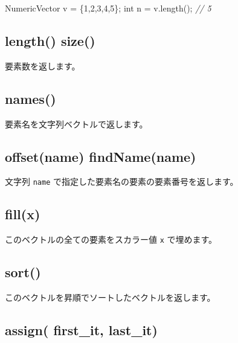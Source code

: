 \documentclass[]{book}
\newenvironment{Shaded}{\begin{snugshade}}{\end{snugshade}}
\newcommand{\CommentTok}[1]{\textcolor[rgb]{0.56,0.35,0.01}{\textit{#1}}}
\newcommand{\DataTypeTok}[1]{\textcolor[rgb]{0.13,0.29,0.53}{#1}}
\newcommand{\DecValTok}[1]{\textcolor[rgb]{0.00,0.00,0.81}{#1}}
\newcommand{\NormalTok}[1]{#1}
\begin{document}
\begin{Shaded}
\begin{Highlighting}[]
\NormalTok{NumericVector v = \{}\DecValTok{1}\NormalTok{,}\DecValTok{2}\NormalTok{,}\DecValTok{3}\NormalTok{,}\DecValTok{4}\NormalTok{,}\DecValTok{5}\NormalTok{\};}
\DataTypeTok{int}\NormalTok{ n = v.length(); }\CommentTok{// 5}
\end{Highlighting}
\end{Shaded}

\hypertarget{length-size}{%
\subsection{length() size()}\label{length-size}}

要素数を返します。

\hypertarget{names}{%
\subsection{names()}\label{names}}

要素名を文字列ベクトルで返します。

\hypertarget{offsetname-findnamename}{%
\subsection{offset(name) findName(name)}\label{offsetname-findnamename}}

文字列 \texttt{name} で指定した要素名の要素の要素番号を返します。

\hypertarget{fillx}{%
\subsection{fill(x)}\label{fillx}}

このベクトルの全ての要素をスカラー値 \texttt{x} で埋めます。

\hypertarget{sort}{%
\subsection{sort()}\label{sort}}

このベクトルを昇順でソートしたベクトルを返します。

\hypertarget{assign-first_it-last_it}{%
\subsection{assign( first\_it, last\_it)}\label{assign-first_it-last_it}}
\end{document}
